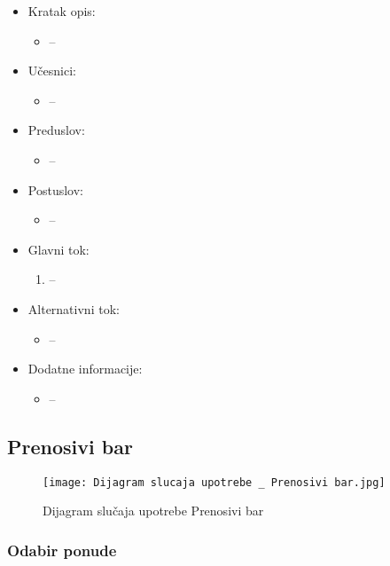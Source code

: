 \documentclass[a4paper]{article}
\begin{document}
\begin{itemize}
    \item Kratak opis:
        \begin{itemize}
            \item --
        \end{itemize}
    \item Učesnici:
        \begin{itemize}
            \item --
        \end{itemize}
    \item Preduslov:
        \begin{itemize}
            \item --
        \end{itemize}
    \item Postuslov:
        \begin{itemize}
            \item --
        \end{itemize}
    \item Glavni tok:
        \begin{enumerate}
            \item  --
        \end{enumerate}
    \item Alternativni tok:
        \begin{itemize}
            \item --
        \end{itemize}
    \item Dodatne informacije:
        \begin{itemize}
            \item --
        \end{itemize}
\end{itemize}



\subsection{Prenosivi bar}

\begin{figure}[H]
    \centering
    \texttt{[image: Dijagram slucaja upotrebe \_ Prenosivi bar.jpg]}
    \caption{Dijagram slučaja upotrebe Prenosivi bar}
    \label{fig:PrenosiviBar}
\end{figure}

\subsubsection{Odabir ponude}
\end{document}
